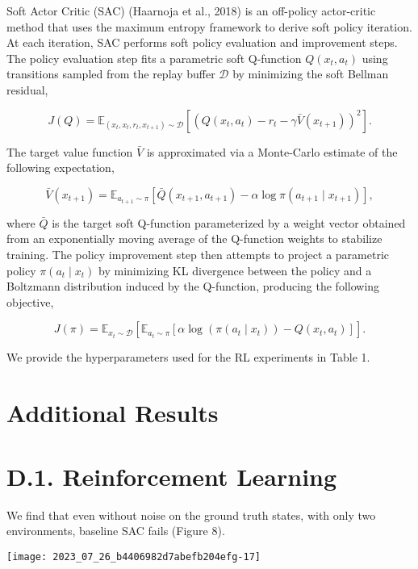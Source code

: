 \documentclass[10pt]{article}
\begin{document}
Soft Actor Critic (SAC) (Haarnoja et al., 2018) is an off-policy actor-critic method that uses the maximum entropy framework to derive soft policy iteration. At each iteration, SAC performs soft policy evaluation and improvement steps. The policy evaluation step fits a parametric soft Q-function $Q\left(x_{t}, a_{t}\right)$ using transitions sampled from the replay buffer $\mathcal{D}$ by minimizing the soft Bellman residual,

\[
J(Q)=\mathbb{E}_{\left(x_{t}, x_{t}, r_{t}, x_{t+1}\right) \sim \mathcal{D}}\left[\left(Q\left(x_{t}, a_{t}\right)-r_{t}-\gamma \bar{V}\left(x_{t+1}\right)\right)^{2}\right] .
\]

The target value function $\bar{V}$ is approximated via a Monte-Carlo estimate of the following expectation,

\[
\bar{V}\left(x_{t+1}\right)=\mathbb{E}_{a_{t+1} \sim \pi}\left[\bar{Q}\left(x_{t+1}, a_{t+1}\right)-\alpha \log \pi\left(a_{t+1} \mid x_{t+1}\right)\right],
\]

where $\bar{Q}$ is the target soft Q-function parameterized by a weight vector obtained from an exponentially moving average of the Q-function weights to stabilize training. The policy improvement step then attempts to project a parametric policy $\pi\left(a_{t} \mid x_{t}\right)$ by minimizing KL divergence between the policy and a Boltzmann distribution induced by the Q-function, producing the following objective,

\[
J(\pi)=\mathbb{E}_{x_{t} \sim \mathcal{D}}\left[\mathbb{E}_{a_{t} \sim \pi}\left[\alpha \log \left(\pi\left(a_{t} \mid x_{t}\right)\right)-Q\left(x_{t}, a_{t}\right)\right]\right] .
\]

We provide the hyperparameters used for the RL experiments in Table 1.

\section{Additional Results}
\section{D.1. Reinforcement Learning}
We find that even without noise on the ground truth states, with only two environments, baseline SAC fails (Figure 8).

\begin{center}
\texttt{[image: 2023\_07\_26\_b4406982d7abefb204efg-17]}
\end{center}
\end{document}
